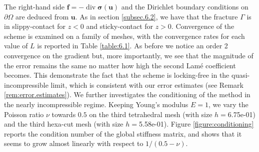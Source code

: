\documentclass[a4paper,11pt]{article}
\theoremstyle{definition}
\theoremstyle{remark}
\newcommand{\bo}[1]{\mathbf{#1}}
\begin{document}
The right-hand side $\mathbf{f} = -\operatorname{div}\boldsymbol{\sigma}(\mathbf{u})$ and the Dirichlet boundary conditions on $\partial\Omega$ are deduced from $\bo{u}$. As in section \ref{subsec.6.2}, we have that the fracture $\Gamma$ is in slippy-contact for $z<0$ and sticky-contact for $z>0$. Convergence of the scheme is examined on a family of meshes, with the convergence rates for each value of $L$ is reported in Table \ref{table:6.1}. As before we notice an order 2 convergence on the gradient but, more importantly, we see that the magnitude of the error remains the same no matter how high the second Lamé coefficient becomes. This demonstrate the fact that the scheme is locking-free in the quasi-incompressible limit, which is consistent with our error estimates (see Remark \ref{rem:error.estimates}). We further investigates the conditioning of the method in the nearly incompressible regime. Keeping Young's modulus $E=1$, we vary the Poisson ratio $\nu$ towards $0.5$ on the third tetrahedral mesh (with size $h=$6.75e-01) and the third hexa-cut mesh (with size $h=$5.58e-01). Figure \ref{figure:conditioning} reports the condition number of the global stiffness matrix, and shows that it seems to grow almost linearly with respect to $1/(0.5-\nu)$.
\end{document}

